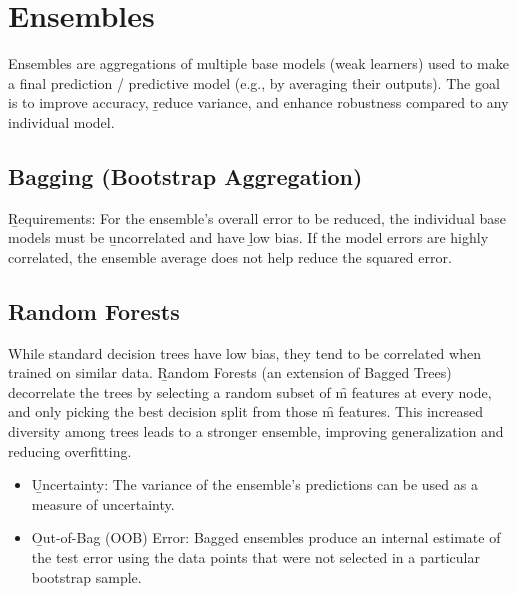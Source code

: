 \section{Ensembles}
Ensembles are aggregations of multiple base models (weak learners) used to make a final prediction / predictive model (e.g., by averaging their outputs). The goal is to improve accuracy, \b{reduce variance}, and enhance robustness compared to any individual model.




\subsection{Bagging (Bootstrap Aggregation)}

\vspace{1em}
\b{Requirements}: For the ensemble's overall error to be reduced, the individual base models must be \b{uncorrelated} and have \b{low bias}. If the model errors are highly correlated, the ensemble average does not help reduce the squared error.






\subsection{Random Forests}
While standard decision trees have low bias, they tend to be correlated when trained on similar data. \b{Random Forests} (an extension of Bagged Trees) decorrelate the trees by selecting a random subset of \f{m} features at every node, and only picking the best decision split from those \f{m} features. This increased diversity among trees leads to a stronger ensemble, improving generalization and reducing overfitting.

\begin{itemize}
\item \b{Uncertainty}: The variance of the ensemble's predictions can be used as a measure of uncertainty.
\item \b{Out-of-Bag (OOB) Error}: Bagged ensembles produce an internal estimate of the test error using the data points that were not selected in a particular bootstrap sample.
\end{itemize}



